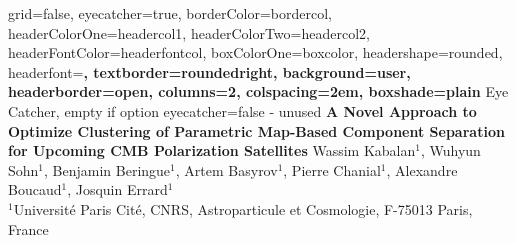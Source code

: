 \documentclass[a2paper,portrait,fontscale=0.9]{baposter}
\begin{document}
\begin{poster}{
	grid=false,
	eyecatcher=true, 
	borderColor=bordercol,
	headerColorOne=headercol1,
	headerColorTwo=headercol2,
	headerFontColor=headerfontcol,
	boxColorOne=boxcolor,
	headershape=rounded,
	headerfont=\Large\sf\bf,
	textborder=roundedright,
	background=user,
	headerborder=open,
    columns=2,
    colspacing=2em,
  boxshade=plain
}
{
    Eye Catcher, empty if option eyecatcher=false - unused
}
{\sf\bf
    A Novel Approach to Optimize Clustering of Parametric Map-Based Component Separation for Upcoming CMB Polarization Satellites
}
{
    \vspace{1em} Wassim Kabalan$^{1}$, Wuhyun Sohn$^{1}$, Benjamin Beringue$^{1}$, Artem Basyrov$^{1}$, Pierre Chanial$^{1}$, Alexandre Boucaud$^{1}$, Josquin Errard$^{1}$\\
    \vspace{1em}
    {\footnotesize 
        $^{1}$Université Paris Cité, CNRS, Astroparticule et Cosmologie, F-75013 Paris, France
    }
}
{
\setlength\fboxsep{0pt}
\setlength\fboxrule{0.5pt}
}


\end{poster}
\end{document}
